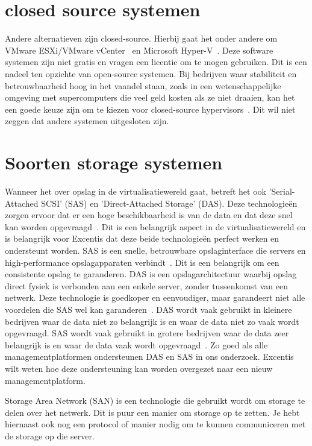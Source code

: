 \section{closed source systemen}
Andere alternatieven zijn closed-source. Hierbij gaat het onder andere om VMware ESXi/VMware vCenter~\autocite{vmware} en Microsoft Hyper-V~\autocite{Eaton2019}. Deze software systemen zijn niet gratis en vragen een licentie om te mogen gebruiken. Dit is een nadeel ten opzichte van open-source systemen.
Bij bedrijven waar stabiliteit en betrouwbaarheid hoog in het vaandel staan, zoals in een wetenschappelijke omgeving met supercomputers die veel geld kosten als ze niet draaien, kan het een goede keuze zijn om te kiezen voor closed-source hypervisors~\autocite{voras2012early}. Dit wil niet zeggen dat andere systemen uitgesloten zijn.


\section{Soorten storage systemen}
Wanneer het over opslag in de virtualisatiewereld gaat, betreft het ook 'Serial-Attached SCSI' (SAS) en 'Direct-Attached Storage' (DAS). Deze technologieën zorgen ervoor dat er een hoge beschikbaarheid is van de data en dat deze snel kan worden opgevraagd~\autocite{griswold2002storage}. Dit is een belangrijk aspect in de virtualisatiewereld en is belangrijk voor Excentis dat deze beide technologieën perfect werken en ondersteunt worden.
SAS is een snelle, betrouwbare opslaginterface die servers en high-performance opslagapparaten verbindt~\autocite{aravindan2014performance}. Dit is een belangrijk om een consistente opslag te garanderen. DAS is een opslagarchitectuur waarbij opslag direct fysiek is verbonden aan een enkele server, zonder tussenkomst van een netwerk. Deze technologie is goedkoper en eenvoudiger, maar garandeert niet alle voordelen die SAS wel kan garanderen~\autocite{griswold2002storage}.
DAS wordt vaak gebruikt in kleinere bedrijven waar de data niet zo belangrijk is en waar de data niet zo vaak wordt opgevraagd. SAS wordt vaak gebruikt in grotere bedrijven waar de data zeer belangrijk is en waar de data vaak wordt opgevraagd~\autocite{griswold2002storage}.
Zo goed als alle managementplatformen ondersteunen DAS en SAS in ons onderzoek. Excentis wilt weten hoe deze ondersteuning kan worden overgezet naar een nieuw managementplatform.

Storage Area Network (SAN) \textcite{ibm2025san} is een technologie die gebruikt wordt om storage te delen over het netwerk.
Dit is puur een manier om storage op te zetten.
Je hebt hiernaast ook nog een protocol of manier nodig om te kunnen communiceren met de storage op die server.


